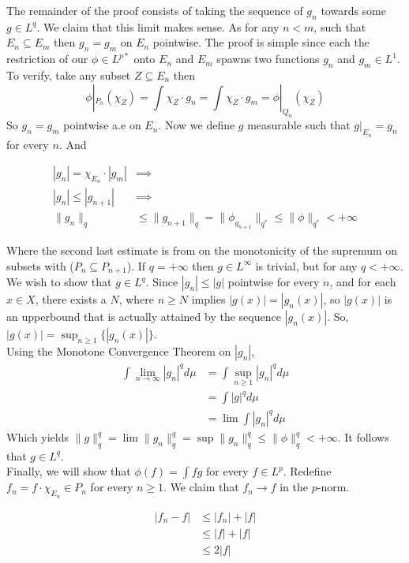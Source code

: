\documentclass[../main.tex]{subfiles}
\begin{document}
The remainder of the proof consists of taking the sequence of $g_n$ towards some $g\in L^q$. We claim that this limit makes sense. As for any $n<m$, such that $E_n\subseteq E_m$ then $g_n = g_m$ on $E_n$ pointwise. The proof is simple since each the restriction of our $\phi\in L^{p*}$ onto $E_n$ and $E_m$ spawns two functions $g_n$ and $g_m\in L^1$. To verify, take any subset $Z\subseteq E_n$ then $$
\phi|_{P_n}(\chi_Z) = \int \chi_Z\cdot g_n = \int \chi_Z\cdot g_m = \phi|_{Q_n}(\chi_Z)
$$
So $g_n = g_m$ pointwise a.e on $E_n$. Now we define $g$ measurable such that $g|_{E_n} = g_n$ for every $n$. And

\begin{align*}
    |g_n| = \chi_{E_n}\cdot |g_m|&\implies \\
    |g_n| \leq |g_{n+1}|&\implies \\
    \lVert g_n \rVert_q
    &\leq\lVert g_{n+1} \rVert_q = \lVert \phi_{g_{n+1}} \rVert_{q^*}
    \leq \lVert \phi \rVert_{q^*}
    < +\infty
\end{align*}



Where the second last estimate is from on the monotonicity of the supremum on subsets with ($P_n\subseteq P_{n+1}$). If $q = +\infty$ then $g\in L^\infty$ is trivial, but for any $q<+\infty$. We wish to show that $g\in L^q$. Since $|g_n|\leq |g|$ pointwise for every $n$, and for each $x\in X$, there exists a $N$, where $n\geq N$ implies $|g(x)| = |g_n(x)|$, so $|g(x)|$ is an upperbound that is actually attained by the sequence $|g_n(x)|$. So, $|g(x)| = \sup_{n\geq 1}\{|g_n(x)|\}$. \\

Using the Monotone Convergence Theorem on $|g_n|$, 
\begin{align*}
    \int \lim_{n\to\infty} |g_n|^q d\mu &= \int\sup_{n\geq 1}|g_n|^q d\mu\\
    &= \int |g|^qd\mu\\
    &= \lim \int |g_n|^q d\mu
\end{align*}
Which yields $\lVert g \rVert^q_q = \lim \lVert g_n \rVert^q_q = \sup \lVert g_n \rVert^q_q \leq \lVert \phi \rVert^q_q < +\infty$. It follows that $g\in L^q$.\\

Finally, we will show that $\phi(f) = \int fg$ for every $f\in L^p$. Redefine $f_n = f\cdot\chi_{E_n} \in P_n$ for every $n\geq 1$. We claim that $f_n \to f$ in the $p$-norm.


\begin{align*}
    |f_n - f| &\leq |f_n| + |f|\\
    &\leq |f| + |f|\\
    &\leq 2|f|
\end{align*}
\end{document}

